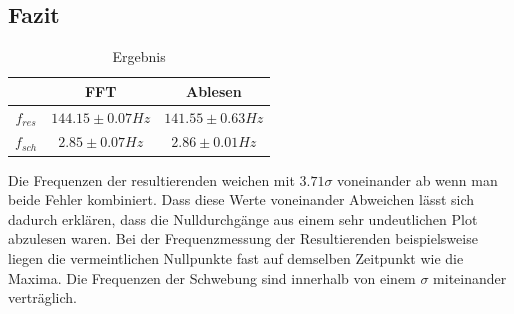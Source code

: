 \documentclass[12pt,a4paper]{article}
\begin{document}
\subsection{Fazit}

\begin{table}[H]\centering
\caption{Ergebnis}
\begin{tabular}{c|cc} 
 & FFT & Ablesen \\ 
\hline
$f_{res}$ & $144.15 \pm 0.07 Hz$
 & $141.55 \pm 0.63 Hz$ \\ 
$f_{sch}$ & $2.85 \pm 0.07 Hz$ & $2.86 \pm 0.01 Hz$ \\ 
\end{tabular}
\end{table}
 
Die Frequenzen der resultierenden weichen mit $3.71 \sigma$ voneinander ab wenn man beide Fehler kombiniert. Dass diese Werte voneinander Abweichen lässt sich dadurch erklären, dass die Nulldurchgänge aus einem sehr undeutlichen Plot abzulesen waren. Bei der Frequenzmessung der Resultierenden beispielsweise liegen die vermeintlichen Nullpunkte fast auf demselben Zeitpunkt wie die Maxima. \newline Die Frequenzen der Schwebung sind innerhalb von einem $\sigma$ miteinander verträglich. 
\end{document}

